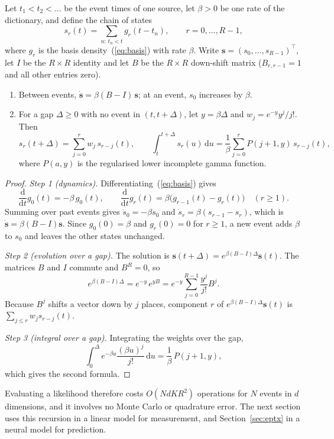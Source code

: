 \begin{lemma}\label{lem:recursion}
Let $t_1<t_2<\dots$ be the event times of one source, let $\beta>0$ be one rate of the
dictionary, and define the chain of states
\[
s_r(t)=\sum_{n:\,t_n<t} g_r(t-t_n),\qquad r=0,\dots,R-1,
\]
where $g_r$ is the basis density~(\ref{eq:basis}) with rate $\beta$. Write
$\bm s=(s_0,\dots,s_{R-1})^\top$, let $I$ be the $R\times R$ identity and let $B$ be the
$R\times R$ down-shift matrix ($B_{r,r-1}=1$ and all other entries zero).
\begin{enumerate}
\item Between events, $\dot{\bm s}=\beta(B-I)\,\bm s$; at an event, $s_0$ increases by $\beta$.
\item For a gap $\Delta\ge0$ with no event in $(t,t+\Delta)$, let $y=\beta\Delta$ and
$w_j=e^{-y}y^j/j!$. Then
\[
s_r(t+\Delta)=\sum_{j=0}^{r}w_j\,s_{r-j}(t),\qquad
\int_t^{t+\Delta}s_r(u)\,\mathrm{d}u=\frac{1}{\beta}\sum_{j=0}^{r}P(j+1,y)\,s_{r-j}(t),
\]
where $P(a,y)$ is the regularised lower incomplete gamma function.
\end{enumerate}
\end{lemma}

\begin{proof}
\emph{Step 1 (dynamics).} Differentiating~(\ref{eq:basis}) gives
\[
\frac{\mathrm{d}}{\mathrm{d}t}g_0(t)=-\beta\,g_0(t),\qquad
\frac{\mathrm{d}}{\mathrm{d}t}g_r(t)=\beta\bigl(g_{r-1}(t)-g_r(t)\bigr)\quad(r\ge1).
\]
Summing over past events gives $\dot s_0=-\beta s_0$ and $\dot s_r=\beta(s_{r-1}-s_r)$, which is
$\dot{\bm s}=\beta(B-I)\bm s$. Since $g_0(0)=\beta$ and $g_r(0)=0$ for $r\ge1$, a new event adds $\beta$ to
$s_0$ and leaves the other states unchanged.

\emph{Step 2 (evolution over a gap).} The solution is $\bm s(t+\Delta)=e^{\beta(B-I)\Delta}\bm s(t)$.
The matrices $B$ and $I$ commute and $B^R=0$, so
\[
e^{\beta(B-I)\Delta}=e^{-y}\,e^{yB}=e^{-y}\sum_{j=0}^{R-1}\frac{y^j}{j!}B^j .
\]
Because $B^j$ shifts a vector down by $j$ places, component $r$ of $e^{\beta(B-I)\Delta}\bm s(t)$
is $\sum_{j\le r}w_j s_{r-j}(t)$.

\emph{Step 3 (integral over a gap).} Integrating the weights over the gap,
\[
\int_0^{\Delta}e^{-\beta u}\frac{(\beta u)^j}{j!}\,\mathrm{d}u=\frac{1}{\beta}\,P(j+1,y),
\]
which gives the second formula.
\end{proof}

Evaluating a likelihood therefore costs $O(N d K R^2)$ operations for $N$ events in $d$
dimensions, and it involves no Monte Carlo or quadrature error. The next section uses this
recursion in a linear model for measurement, and Section~\ref{sec:eptx} in a neural model for
prediction.
